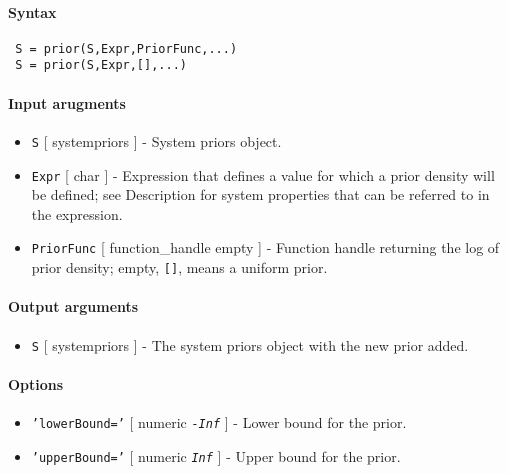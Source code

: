 


	\paragraph{Syntax}
 
 \begin{verbatim}
 S = prior(S,Expr,PriorFunc,...)
 S = prior(S,Expr,[],...)
 \end{verbatim}
 
 \paragraph{Input arugments}
 
 \begin{itemize}
 \item
   \texttt{S} {[} systempriors {]} - System priors object.
 \item
   \texttt{Expr} {[} char {]} - Expression that defines a value for which
   a prior density will be defined; see Description for system properties
   that can be referred to in the expression.
 \item
   \texttt{PriorFunc} {[} function\_handle \textbar{} empty {]} -
   Function handle returning the log of prior density; empty,
   \texttt{{[}{]}}, means a uniform prior.
 \end{itemize}
 
 \paragraph{Output arguments}
 
 \begin{itemize}
 \item
   \texttt{S} {[} systempriors {]} - The system priors object with the
   new prior added.
 \end{itemize}
 
 \paragraph{Options}
 
 \begin{itemize}
 \item
   \texttt{'lowerBound='} {[} numeric \textbar{} \emph{\texttt{-Inf}} {]}
   - Lower bound for the prior.
 \item
   \texttt{'upperBound='} {[} numeric \textbar{} \emph{\texttt{Inf}} {]}
   - Upper bound for the prior.
 \end{itemize}
 
